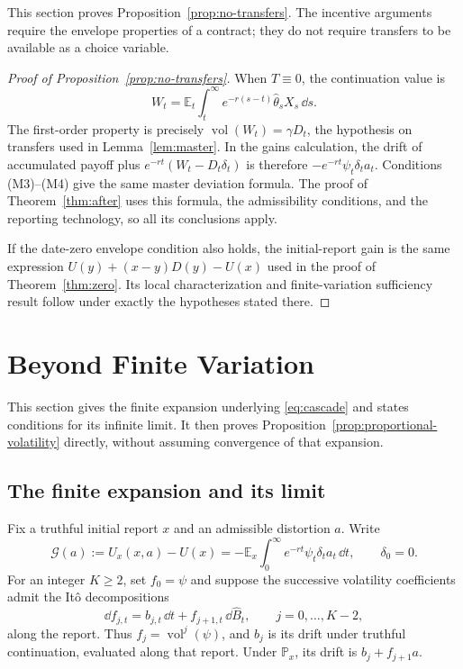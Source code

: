 \documentclass[12pt]{article}
\DeclareMathOperator{\vol}{vol}
\newcommand{\E}{\mathbb{E}}
\newcommand{\hth}{\hat\theta}
\newcommand{\hB}{\hat B}
\newcommand{\Et}{\mathbb{E}_t}
\begin{document}
This section proves Proposition~\ref{prop:no-transfers}. The incentive
arguments require the envelope properties of a contract; they do not
require transfers to be available as a choice variable.

\begin{proof}[Proof of Proposition~\ref{prop:no-transfers}]
When \(T\equiv0\), the continuation value is
\[
  W_t=\Et\int_t^\infty e^{-r(s-t)}\hth_sX_s\,\dd s.
\]
The first-order property is precisely
\(\vol(W_t)=\gamma D_t\), the hypothesis on transfers used in
Lemma~\ref{lem:master}. In the gains calculation, the drift of
accumulated payoff plus \(e^{-rt}(W_t-D_t\delta_t)\) is therefore
\(-e^{-rt}\psi_t\delta_ta_t\). Conditions (M3)--(M4) give the same
master deviation formula. The proof of Theorem~\ref{thm:after}
uses this formula, the admissibility conditions, and the reporting
technology, so all its conclusions apply.

If the date-zero envelope condition also holds, the initial-report
gain is the same expression
\(U(y)+(x-y)D(y)-U(x)\) used in the proof of
Theorem~\ref{thm:zero}. Its local characterization and
finite-variation sufficiency result follow under exactly the
hypotheses stated there.
\end{proof}

\section{Beyond Finite Variation}
\label{app:beyond-fv}

This section gives the finite expansion underlying \eqref{eq:cascade}
and states conditions for its infinite limit. It then proves
Proposition~\ref{prop:proportional-volatility} directly, without
assuming convergence of that expansion.

\subsection{The finite expansion and its limit}

Fix a truthful initial report \(x\) and an admissible distortion
\(a\). Write
\[
  \mathcal G(a):=U_x(x,a)-U(x)
  =-\E_x\int_0^\infty e^{-rt}\psi_t\delta_ta_t\,\dd t,
  \qquad \delta_0=0.
\]
For an integer \(K\geq2\), set \(f_0=\psi\) and suppose the
successive volatility coefficients admit the It\^o decompositions
\[
  \dd f_{j,t}=b_{j,t}\,\dd t+f_{j+1,t}\,\dd\hB_t,
  \qquad j=0,\ldots,K-2,
\]
along the report. Thus \(f_j=\vol^j(\psi)\), and \(b_j\) is its
drift under truthful continuation, evaluated along that report.
Under \(\mathbb P_x\), its drift is
\(b_j+f_{j+1}a\).
\end{document}
